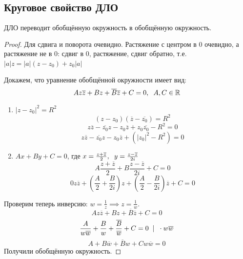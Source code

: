 \subsection{Круговое свойство ДЛО}
\begin{theorem}
  ДЛО переводит обобщённую окружность в обобщённую окружность.
\end{theorem}
\begin{proof}
    Для сдвига и поворота очевидно. Растяжение с центром в 0 очевидно, а растяжение не в 0: сдвиг в 0, растяжение, сдвиг обратно, т.е. $|a|z = |a|(z-z_0)+z_0|a|$

    Докажем, что уравнение обобщённой окружности имеет вид:
    \[Az\overline{z} + Bz+\overline{B}\overline{z}+C=0,\hspace{0.2cm} A,C\in\mathbb{R}\]
    \begin{enumerate}
      \item $|z-z_0|^2=R^2$
      \[(z-z_0)(\overline{z}-\overline{z_0})=R^2\]
      \[z\overline{z} - \overline{z_0}z - z_0\overline{z} + z_0\overline{z_0} - R^2 = 0\]
      \[z\overline{z} - \overline{z_0}z - z_0\overline{z} + \left(|z_0|^2 - R^2\right) = 0\]
      \item $Ax+By+C=0$, где $x=\frac{z+\overline{z}}{2},\hspace{0.2cm} y=\frac{z-\overline{z}}{2i}$
      \[A\frac{z+\overline{z}}{2} + B\frac{z-\overline{z}}{2i}+C=0\]
      \[0z\overline{z}+\left(\frac{A}{2} + \frac{B}{2i}\right)z + \left(\frac{A}{2} - \frac{B}{2i}\right)\overline{z} + C = 0\]
    \end{enumerate}
    Проверим теперь инверсию: $w=\frac{1}{z}\implies z = \frac{1}{w}$.
    \[Az\overline{z} + Bz+\overline{B}\overline{z}+C=0\]
    \[\frac{A}{w\overline{w}} + \frac{B}{w} + \frac{\overline{B}}{\overline{w}} + C = 0\hspace{0.2cm} |\hspace{0.2cm} \cdot w\overline{w}\]
    \[A + B\overline{w} + \overline{B}w + Cw\overline{w}=0\]
    Получили обобщённую окружность.
\end{proof}
